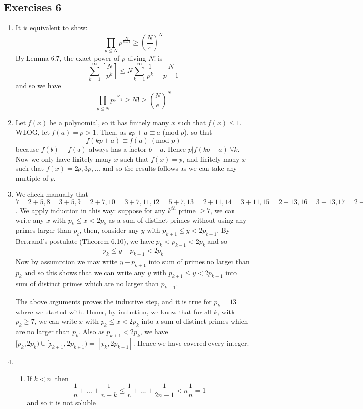 \subsection{Exercises 6}
\begin{enumerate}
\item It is equivalent to show:
$$\prod_{p \le N}p^{\frac{N}{p-1}} \ge \left(\frac{N}{e}\right)^N$$
By Lemma 6.7, the exact power of $p$ diving $N!$ is
$$\sum_{k=1}^{\infty}\left[\frac{N}{p^k}\right] \le N \sum_{k=1}^\infty \frac{1}{p^k}=\frac{N}{p-1}$$
and so we have
$$\prod_{p \le N}p^{\frac{N}{p-1}} \ge N! \ge \left(\frac{N}{e}\right)^N$$
\item Let $f(x)$ be a polynomial, so it has finitely many $x$ such that $f(x) \le 1$. WLOG, let
$f(a)=p >1$. Then, as $kp+a \equiv a$ (mod $p$), so that
$$f(kp+a) \equiv f(a)~(\text{mod } p)$$
because $f(b)-f(a)$ always has a factor $b-a$. Hence $p \big| f(kp+a)~\forall k$.
Now we only have finitely many $x$ such that $f(x)=p$, and finitely many $x$ such that $f(x)=2p,3p,\ldots$ and so the results follows as we can take any multiple of $p$.
\item We check manually that $7=2+5,8=3+5,9=2+7,10=3+7,11,12=5+7,13=2+11,14=3+11,15=2+13,16=3+13,
17=2+3+5+7,18=7+11,19=3+5+11,20=7+13,21=2+3+5+11,22=2+7+13,23=3+7+13,24=11+13,25=5+7+13,26=2+11+13$.
We apply induction in this way: suppose for any $k^{th}$ prime $\ge 7$, we can write any $x$ with
$p_k \le x < 2p_k$ as a sum of distinct primes without using any primes larger than $p_k$, then, consider any
$y$ with $p_{k+1} \le y < 2p_{k+1}$.
By Bertrand's postulate (Theorem 6.10), we have $p_k < p_{k+1}<2p_k$
and so
$$p_k \le y-p_{k+1} < 2p_k$$
Now by assumption we may write $y-p_{k+1}$ into sum of primes no larger than $p_k$ and so this shows that we can write any $y$ with $p_{k+1} \le y < 2p_{k+1}$ into sum of distinct primes which are no larger than $p_{k+1}$.

The above arguments proves the inductive step, and it is true for $p_k=13$ where we started with. Hence, by induction, we know that for all $k$, with $p_k \ge 7$, we can write $x$ with $p_k \le x <2p_k$ into a sum of distinct primes which are no larger than $p_k$. Also as $p_{k+1}<2p_k$,
we have $[p_k,2p_k) \cup [p_{k+1},2p_{k+1})=[p_k,2p_{k+1}]$. Hence we have covered every integer.
\item \begin{enumerate}
\item[(i)] If $k<n$, then
$$\frac{1}{n}+\ldots+\frac{1}{n+k} \le \frac{1}{n}+\ldots+\frac{1}{2n-1} <n \frac{1}{n}=1$$
and so it is not soluble


\end{enumerate}
\end{enumerate}
